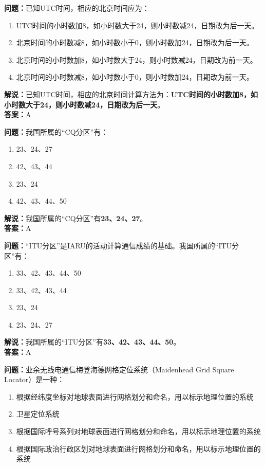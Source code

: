 \textbf{问题：}已知UTC时间，相应的北京时间应为：

\begin{enumerate}[label=\Alph*), leftmargin=1cm]
	\item UTC时间的小时数加8，如小时数大于24，则小时数减24，日期改为后一天。
	\item 北京时间的小时数减8，如小时数小于0，则小时数加24，日期改为后一天。
	\item 北京时间的小时数加8，如小时数大于24，则小时数减24，日期改为前一天。
	\item 北京时间的小时数减8，如小时数小于0，则小时数加24，日期改为前一天。
\end{enumerate}

\textbf{解说：}已知UTC时间，相应的北京时间计算方法为：\textbf{UTC时间的小时数加8，如小时数大于24，则小时数减24，日期改为后一天}。\\\textbf{答案：}A



\textbf{问题：}我国所属的“CQ分区”有：

\begin{enumerate}[label=\Alph*), leftmargin=1cm]
	\item 23、24、27
	\item 42、43、44
	\item 23、24
	\item 42、43、44、50
\end{enumerate}

\textbf{解说：}我国所属的“CQ分区”有\textbf{23、24、27}。\\\textbf{答案：}A



\textbf{问题：}“ITU分区”是IARU的活动计算通信成绩的基础。我国所属的“ITU分区”有：

\begin{enumerate}[label=\Alph*), leftmargin=1cm]
	\item 33、42、43、44、50
	\item 33、42、43、44
	\item 23、24
	\item 23、24、27
\end{enumerate}

\textbf{解说：}我国所属的“ITU分区”有\textbf{33、42、43、44、50}。\\\textbf{答案：}A



\textbf{问题：}业余无线电通信梅登海德网格定位系统（Maidenhead Grid Square Locator）是一种：

\begin{enumerate}[label=\Alph*), leftmargin=1cm]
	\item 根据经纬度坐标对地球表面进行网格划分和命名，用以标示地理位置的系统
	\item 卫星定位系统
	\item 根据国际呼号系列对地球表面进行网格划分和命名，用以标示地理位置的系统
	\item 根据国际政治行政区划对地球表面进行网格划分和命名，用以标示地理位置的系统
\end{enumerate}

